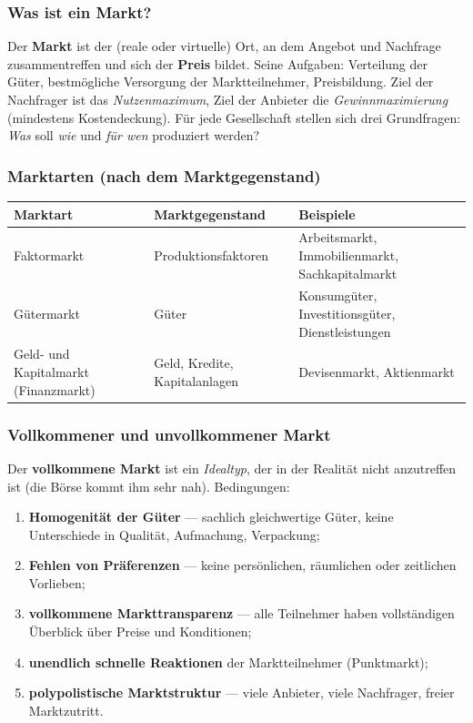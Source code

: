 \documentclass[11pt, a4paper]{article}
\begin{document}
\subsubsection{Was ist ein Markt?}

Der \textbf{Markt} ist der (reale oder virtuelle) Ort, an dem Angebot und Nachfrage
zusammentreffen und sich der \textbf{Preis} bildet. Seine Aufgaben: Verteilung der Güter,
bestmögliche Versorgung der Marktteilnehmer, Preisbildung. Ziel der Nachfrager ist das
\emph{Nutzenmaximum}, Ziel der Anbieter die \emph{Gewinnmaximierung} (mindestens
Kostendeckung). Für jede Gesellschaft stellen sich drei Grundfragen: \emph{Was} soll
\emph{wie} und \emph{für wen} produziert werden?

\subsubsection{Marktarten (nach dem Marktgegenstand)}

\begin{center}
\begin{tabular}{p{3.6cm} p{4.2cm} p{6.2cm}}
\textbf{Marktart} & \textbf{Marktgegenstand} & \textbf{Beispiele}\\
\hline
Faktormarkt & Produktionsfaktoren & Arbeitsmarkt, Immobilienmarkt, Sachkapitalmarkt\\
Gütermarkt & Güter & Konsumgüter, Investitionsgüter, Dienstleistungen\\
Geld- und Kapitalmarkt (Finanzmarkt) & Geld, Kredite, Kapitalanlagen & Devisenmarkt, Aktienmarkt\\
\end{tabular}
\end{center}

\subsubsection{Vollkommener und unvollkommener Markt}

Der \textbf{vollkommene Markt} ist ein \emph{Idealtyp}, der in der Realität nicht
anzutreffen ist (die Börse kommt ihm sehr nah). Bedingungen:

\begin{enumerate}
  \item \textbf{Homogenität der Güter} --- sachlich gleichwertige Güter, keine Unterschiede
    in Qualität, Aufmachung, Verpackung;
  \item \textbf{Fehlen von Präferenzen} --- keine persönlichen, räumlichen oder zeitlichen
    Vorlieben;
  \item \textbf{vollkommene Markttransparenz} --- alle Teilnehmer haben vollständigen
    Überblick über Preise und Konditionen;
  \item \textbf{unendlich schnelle Reaktionen} der Marktteilnehmer (Punktmarkt);
  \item \textbf{polypolistische Marktstruktur} --- viele Anbieter, viele Nachfrager, freier
    Marktzutritt.
\end{enumerate}
\end{document}

